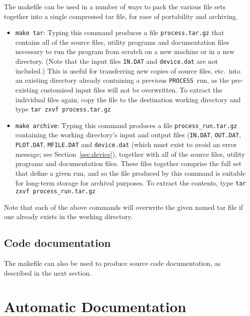 \documentclass[11pt,a4paper]{report}
\newcommand{\process}{\mbox{\texttt{PROCESS}}}
\begin{document}
The makefile can be used in a number of ways to pack the various file sets
together into a single compressed tar file, for ease of portability and
archiving.

\begin{itemize}

\item \texttt{make tar}: Typing this command produces a file
  \texttt{process.tar.gz} that contains all of the source files, utility
  programs and documentation files necessary to run the program from scratch
  on a new machine or in a new directory. (Note that the input files
  \texttt{IN.DAT} and \texttt{device.dat} are not included.) This is useful
  for transferring new copies of source files, etc.\ into an existing
  directory already containing a previous \process\ run, as the pre-existing
  customised input files will not be overwritten. To extract the individual
  files again, copy the file to the destination working directory and type
  \verb+tar zxvf process.tar.gz+

\item \texttt{make archive}: Typing this command produces a file
  \texttt{process\_run.tar.gz} containing the working directory's input and
  output files (\texttt{IN.DAT}, \texttt{OUT.DAT}, \texttt{PLOT.DAT},
  \texttt{MFILE.DAT} and \texttt{device.dat} (which must exist to avoid an
  error message; see Section~\ref{sec:device}), together with all of the
  source files, utility programs and documentation files. These files together
  comprise the full set that define a given run, and so the file produced by
  this command is suitable for long-term storage for archival purposes. To
  extract the contents, type \verb+tar zxvf process_run.tar.gz+
\end{itemize}

Note that each of the above commands will overwrite the given named tar file
if one already exists in the working directory.

\subsection{Code documentation}

The makefile can also be used to produce source code documentation, as
described in the next section.

\section{Automatic Documentation}
\label{sec:autodoc}
\end{document}
